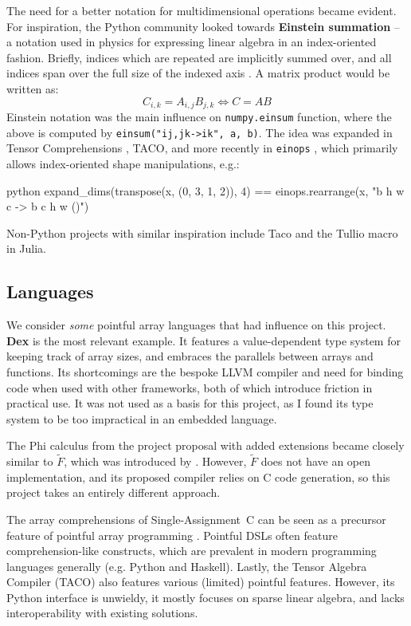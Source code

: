 The need for a better notation for multidimensional operations became evident. For inspiration, the Python community looked towards \textbf{Einstein summation} -- a notation used in physics for expressing linear algebra in an index-oriented fashion. Briefly, indices which are repeated are implicitly summed over, and all indices span over the full size of the indexed axis \cite{aahlander2002einstein}. A matrix product would be written as:
$$ C_{i,k} = A_{i,j} B_{j,k} \iff C = AB $$
Einstein notation was the main influence on \texttt{numpy.einsum} function, where the above is computed by \texttt{einsum("ij,jk->ik", a, b)}. The idea was expanded in Tensor Comprehensions \cite{vasilache2018tensor}, TACO, and more recently in \texttt{einops} \cite{rogozhnikov2021einops}, which primarily allows index-oriented shape manipulations, e.g.:
\begin{center}
\begin{cminted}{python}
expand_dims(transpose(x, (0, 3, 1, 2)), 4) == einops.rearrange(x, "b h w c -> b c h w ()")
\end{cminted}
\end{center}
Non-Python projects with similar inspiration include Taco \cite{kjolstad2017tensor} and the Tullio macro in Julia.


\subsection{Languages}

We consider \textit{some} pointful array languages that had influence on this project. \textbf{Dex} is the most relevant example. It features a value-dependent type system for keeping track of array sizes, and embraces the parallels between arrays and functions. Its shortcomings are the bespoke LLVM compiler and need for binding code when used with other frameworks, both of which introduce friction in practical use. It was not used as a basis for this project, as I found its type system to be too impractical in an embedded language.

The Phi calculus from the project proposal with added extensions became closely similar to $\tilde F$, which was introduced by \textcite{shaikhha2019efficient}. However, $\tilde F$ does not have an open implementation, and its proposed compiler relies on C code generation, so this project takes an entirely different approach. 

The array comprehensions of Single-Assignment~C can be seen as a precursor feature of pointful array programming \cite{scholz1994single}. Pointful DSLs often feature comprehension-like constructs, which are prevalent in modern programming languages generally (e.g. Python and Haskell). Lastly, the Tensor Algebra Compiler (TACO) also features various (limited) pointful features. However, its Python interface is unwieldy, it mostly focuses on sparse linear algebra, and lacks interoperability with existing solutions.


